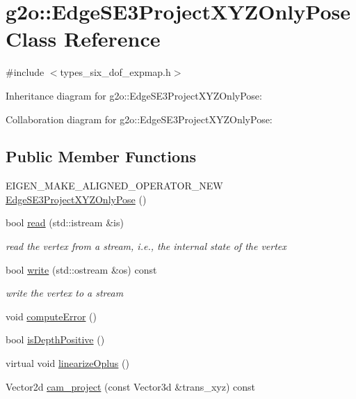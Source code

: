 \hypertarget{classg2o_1_1EdgeSE3ProjectXYZOnlyPose}{}\section{g2o\+:\+:Edge\+S\+E3\+Project\+X\+Y\+Z\+Only\+Pose Class Reference}
\label{classg2o_1_1EdgeSE3ProjectXYZOnlyPose}


{\ttfamily \#include $<$types\+\_\+six\+\_\+dof\+\_\+expmap.\+h$>$}



Inheritance diagram for g2o\+:\+:Edge\+S\+E3\+Project\+X\+Y\+Z\+Only\+Pose\+:


Collaboration diagram for g2o\+:\+:Edge\+S\+E3\+Project\+X\+Y\+Z\+Only\+Pose\+:
\subsection*{Public Member Functions}
\begin{DoxyCompactItemize}
\item 
E\+I\+G\+E\+N\+\_\+\+M\+A\+K\+E\+\_\+\+A\+L\+I\+G\+N\+E\+D\+\_\+\+O\+P\+E\+R\+A\+T\+O\+R\+\_\+\+N\+EW \hyperlink{classg2o_1_1EdgeSE3ProjectXYZOnlyPose_a617972556497ab31cc745f6d3eb59c58}{Edge\+S\+E3\+Project\+X\+Y\+Z\+Only\+Pose} ()
\item 
bool \hyperlink{classg2o_1_1EdgeSE3ProjectXYZOnlyPose_a28994ddf2cab7b61566ce55ad4b43388}{read} (std\+::istream \&is)
\begin{DoxyCompactList}\small\item\em read the vertex from a stream, i.\+e., the internal state of the vertex \end{DoxyCompactList}\item 
bool \hyperlink{classg2o_1_1EdgeSE3ProjectXYZOnlyPose_a5bf685170d6b17908b2a70ccc7e40904}{write} (std\+::ostream \&os) const 
\begin{DoxyCompactList}\small\item\em write the vertex to a stream \end{DoxyCompactList}\item 
void \hyperlink{classg2o_1_1EdgeSE3ProjectXYZOnlyPose_a6752098d3322d30e43a6a3a668a3b009}{compute\+Error} ()
\item 
bool \hyperlink{classg2o_1_1EdgeSE3ProjectXYZOnlyPose_abd6f619de5af8855c8ee21fcfad51c9e}{is\+Depth\+Positive} ()
\item 
virtual void \hyperlink{classg2o_1_1EdgeSE3ProjectXYZOnlyPose_abe6d775aade1277786274c328aa2c38b}{linearize\+Oplus} ()
\item 
Vector2d \hyperlink{classg2o_1_1EdgeSE3ProjectXYZOnlyPose_a28af528a4bf0f76988896fc320ba6a64}{cam\+\_\+project} (const Vector3d \&trans\+\_\+xyz) const 
\end{DoxyCompactItemize}

